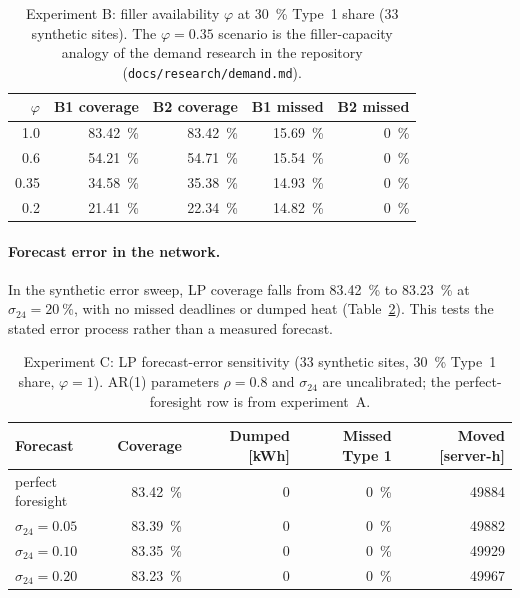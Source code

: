 \begin{table}[ht]
  \centering
  \caption{Experiment B: filler availability $\varphi$ at \qty{30}{\percent} Type~1 share
    (33 synthetic sites). The $\varphi=0.35$ scenario is the filler-capacity analogy of the demand
    research in the repository (\texttt{docs/research/demand.md}).}
  \label{tab:exp-b}
  \begin{tabular}{rrrrr}
    \toprule
    $\varphi$ & B1 coverage & B2 coverage & B1 missed & B2 missed \\
    \midrule
    1.0 & \qty{83.42}{\percent} & \qty{83.42}{\percent} & \qty{15.69}{\percent} & \qty{0}{\percent} \\
    0.6 & \qty{54.21}{\percent} & \qty{54.71}{\percent} & \qty{15.54}{\percent} & \qty{0}{\percent} \\
    0.35 & \qty{34.58}{\percent} & \qty{35.38}{\percent} & \qty{14.93}{\percent} & \qty{0}{\percent} \\
    0.2 & \qty{21.41}{\percent} & \qty{22.34}{\percent} & \qty{14.82}{\percent} & \qty{0}{\percent} \\
    \bottomrule
  \end{tabular}
\end{table}

\paragraph{Forecast error in the network.} In the synthetic error sweep, LP coverage falls
from \qty{83.42}{\percent} to \qty{83.23}{\percent} at
$\sigma_{24}=\qty{20}{\percent}$, with no missed deadlines or dumped heat
(Table~\ref{tab:exp-c}). This tests the stated error process rather than a measured forecast.

\begin{table}[ht]
  \centering
  \caption{Experiment C: LP forecast-error sensitivity (33 synthetic sites,
    \qty{30}{\percent} Type~1 share, $\varphi=1$). AR(1) parameters $\rho=0.8$ and
    $\sigma_{24}$ are uncalibrated; the perfect-foresight row is from experiment~A.}
  \label{tab:exp-c}
  \begin{tabular}{lrrrr}
    \toprule
    Forecast & Coverage & Dumped [kWh] & Missed Type 1 & Moved [server-h] \\
    \midrule
    perfect foresight & \qty{83.42}{\percent} & 0 & \qty{0}{\percent} & \num{49884} \\
    $\sigma_{24} = 0.05$ & \qty{83.39}{\percent} & 0 & \qty{0}{\percent} & \num{49882} \\
    $\sigma_{24} = 0.10$ & \qty{83.35}{\percent} & 0 & \qty{0}{\percent} & \num{49929} \\
    $\sigma_{24} = 0.20$ & \qty{83.23}{\percent} & 0 & \qty{0}{\percent} & \num{49967} \\
    \bottomrule
  \end{tabular}
\end{table}


